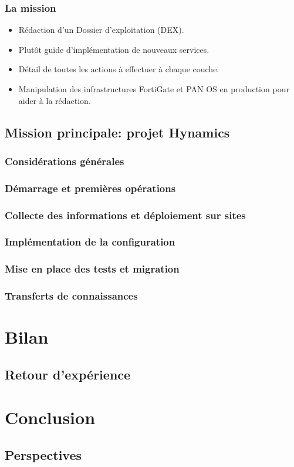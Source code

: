 \documentclass[french, a4paper]{beamer}
\begin{document}
\begin{frame}
    \frametitle{La mission}
    \begin{itemize}
        \item Rédaction d'un Dossier d'exploitation (DEX).
        \item Plutôt guide d'implémentation de nouveaux services.
        \item Détail de toutes les actions à effectuer à chaque couche.
        \item Manipulation des infrastructures FortiGate et PAN OS en production
            pour aider à la rédaction.
    \end{itemize}
\end{frame}

\subsection{Mission principale: projet Hynamics}
\subsubsection{Considérations générales}
\subsubsection{Démarrage et premières opérations}
\subsubsection{Collecte des informations et déploiement sur sites}
\subsubsection{Implémentation de la configuration}
\subsubsection{Mise en place des tests et migration}
\subsubsection{Transferts de connaissances}


\section{Bilan}
\subsection{Retour d'expérience}


\section{Conclusion}
\subsection{Perspectives}
\end{document}
